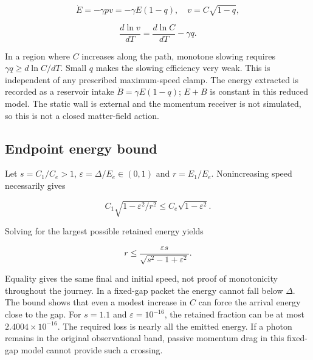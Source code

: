 \documentclass[
  11pt,
  twoside]{article}
\begin{document}
\[\dot E=-\gamma pv=-\gamma E(1-q),\quad v=C\sqrt{1-q},\]

\[\frac{d\ln v}{dT}=\frac{d\ln C}{dT}-\gamma q.\]

In a region where \(C\) increases along the path, monotone slowing
requires \(\gamma q\geq d\ln C/dT\). Small \(q\) makes the slowing
efficiency very weak. This is independent of any prescribed
maximum-speed clamp. The energy extracted is recorded as a reservoir
intake \(\dot B=\gamma E(1-q)\); \(E+B\) is constant in this reduced
model. The static wall is external and the momentum receiver is not
simulated, so this is not a closed matter-field action.

\subsection{Endpoint energy bound}\label{endpoint-energy-bound}

Let \(s=C_1/C_e>1\), \(\varepsilon=\Delta/E_e\in(0,1)\) and
\(r=E_1/E_e\). Nonincreasing speed necessarily gives

\[C_1\sqrt{1-\varepsilon^2/r^2}\leq C_e\sqrt{1-\varepsilon^2}.\]

Solving for the largest possible retained energy yields

\[\boxed{r\leq \frac{\varepsilon s}{\sqrt{s^2-1+\varepsilon^2}}.}\]

Equality gives the same final and initial speed, not proof of
monotonicity throughout the journey. In a fixed-gap packet the energy
cannot fall below \(\Delta\). The bound shows that even a modest
increase in \(C\) can force the arrival energy close to the gap. For
\(s=1.1\) and \(\varepsilon=10^{-16}\), the retained fraction can be at
most \(2.4004\times10^{-16}\). The required loss is nearly all the
emitted energy. If a photon remains in the original observational band,
passive momentum drag in this fixed-gap model cannot provide such a
crossing.
\end{document}
